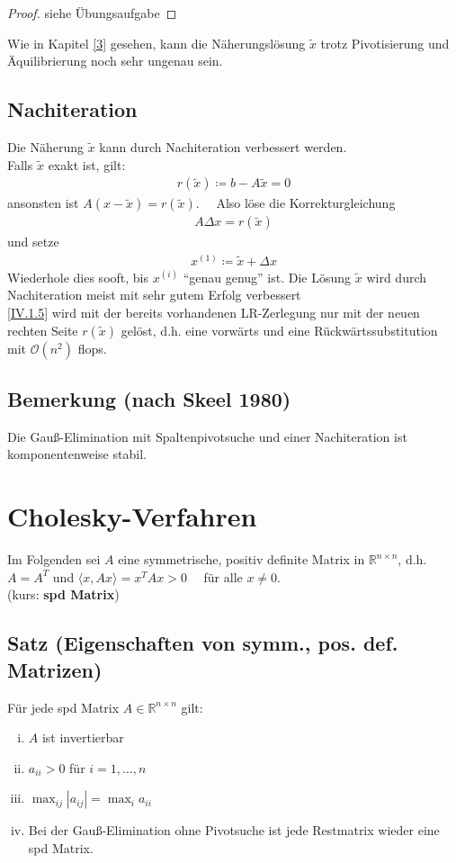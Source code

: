 \documentclass[ngerman,fontsize=11pt, paper=a4, parskip=half, titlepage=true, toc=bib]{scrbook}
\newcommand{\Renn}{\mathds{R}^{n\times n}}
\newcommand{\sectione}[1]{\section{#1} \setcounter{equation}{0}}
\begin{document}
  \begin{proof}
    siehe Übungsaufgabe
  \end{proof}

  Wie in Kapitel \ref{3} gesehen, kann die Näherungslösung $\widetilde{x}$ 
  trotz Pivotisierung und Äquilibrierung noch sehr ungenau sein.


  \subsection{Nachiteration} 
  Die Näherung $\widetilde{x}$ kann durch Nachiteration verbessert werden. \\
  Falls $\widetilde{x}$ exakt ist, gilt:
  \begin{gather}
    r(\widetilde{x}) \coloneqq b-A\widetilde{x} =0 \label{IV.1.4}
  \end{gather}
  ansonsten ist $A(x-\widetilde{x})=r(\widetilde{x}).$ \ \
  Also löse die Korrekturgleichung
  \begin{gather}
    A\Delta x = r(\widetilde{x}) 	\label{IV.1.5}
  \end{gather}
  und setze
  \begin{gather*}
    x^{(1)} \coloneqq \widetilde{x} +\Delta x
  \end{gather*}
  Wiederhole dies sooft, bis $x^{(i)}$ \enquote{genau genug} ist.
  Die Lösung $\widetilde{x}$ wird durch Nachiteration meist mit sehr gutem Erfolg verbessert
  \cite[genaueres in ][]{dahmenreusken}\\
  \eqref{IV.1.5} wird mit der bereits vorhandenen LR-Zerlegung nur mit der neuen rechten Seite $r(\widetilde{x})$ gelöst, d.h. eine vorwärts und eine Rückwärtssubstitution
  mit $\mathcal{O}(n^2)$ flops.

  \subsection{Bemerkung (nach Skeel 1980)}
  Die Gauß-Elimination mit Spaltenpivotsuche und einer Nachiteration ist komponentenweise stabil.


  \sectione{Cholesky-Verfahren}
  Im Folgenden sei $A$ eine symmetrische, positiv definite Matrix in $\Renn $, d.h.
  $A=A^T$ und $\langle x, Ax \rangle = x^TAx > 0 \quad $ für alle $ x\neq 0$. \\
  (kurs: \textbf{spd Matrix}) \index{spd Matrix}

  \subsection{Satz (Eigenschaften von symm., pos. def. Matrizen)} \label{4.2.1}
  Für jede spd Matrix $A\in \Renn $ gilt:
  \begin{enumerate}[i)]	
  \item $A$ ist invertierbar
  \item $a_{ii}>0$ für $i=1, \dots , n$
  \item $\max_{ij}|a_{ij}| = \max_{i}a_{ii}$
  \item Bei der Gauß-Elimination ohne Pivotsuche ist jede Restmatrix wieder eine spd Matrix.
  \end{enumerate}
\end{document}
